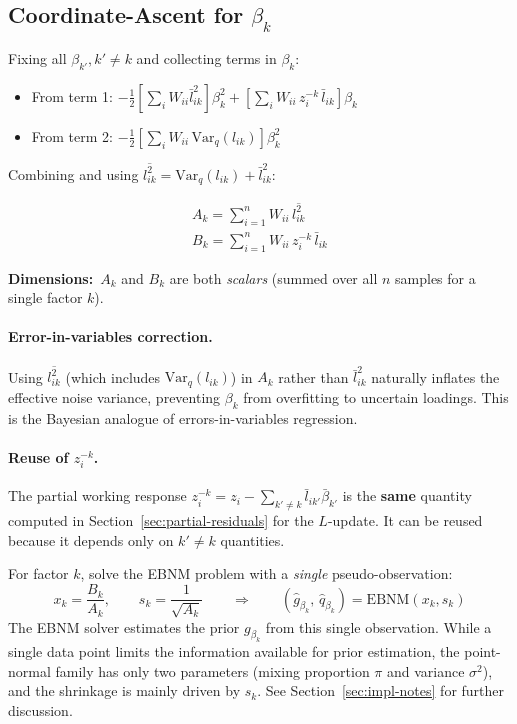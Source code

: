 \documentclass[11pt]{article}
\newcommand{\lbar}[2]{\bar{l}_{#1#2}}
\newcommand{\betabar}[1]{\bar{\beta}_{#1}}
\newcommand{\lsec}[2]{\overline{l^2_{#1#2}}}
\begin{document}
\subsection{Coordinate-Ascent for $\beta_k$}

Fixing all $\beta_{k'}, k'\neq k$ and collecting terms in $\beta_k$:

\begin{itemize}[noitemsep]
\item From term 1: $-\frac{1}{2}[\sum_i W_{ii}\lbar{i}{k}^2]\beta_k^2
      + [\sum_i W_{ii}\,z^{-k}_i\,\lbar{i}{k}]\beta_k$
\item From term 2: $-\frac{1}{2}[\sum_i W_{ii}\,\mathrm{Var}_q(l_{ik})]\beta_k^2$
\end{itemize}

Combining and using $\lsec{i}{k} = \mathrm{Var}_q(l_{ik}) + \lbar{i}{k}^2$:

\begin{align}
  \boxed{A_k = \sum_{i=1}^n W_{ii}\,\lsec{i}{k}}
  \label{eq:A-beta} \\[4pt]
  \boxed{B_k = \sum_{i=1}^n W_{ii}\,z^{-k}_i\,\lbar{i}{k}}
  \label{eq:B-beta}
\end{align}

\textbf{Dimensions:}\ $A_k$ and $B_k$ are both \emph{scalars} (summed
over all $n$ samples for a single factor $k$).

\paragraph{Error-in-variables correction.}
Using $\lsec{i}{k}$ (which includes $\mathrm{Var}_q(l_{ik})$) in $A_k$
rather than $\lbar{i}{k}^2$ naturally inflates the effective noise variance,
preventing $\beta_k$ from overfitting to uncertain loadings.  This is the
Bayesian analogue of errors-in-variables regression.

\paragraph{Reuse of $z^{-k}_i$.}
The partial working response $z^{-k}_i = z_i - \sum_{k'\neq k}\lbar{i}{k'}\betabar{k'}$
is the \textbf{same} quantity computed in Section~\ref{sec:partial-residuals}
for the $L$-update.  It can be reused because it depends only on $k'\neq k$
quantities.

\begin{ebnmbox}
For factor $k$, solve the EBNM problem with a \emph{single}
pseudo-observation:
\[
  x_k = \frac{B_k}{A_k}, \qquad s_k = \frac{1}{\sqrt{A_k}}
  \qquad \Longrightarrow \qquad
  (\hat{g}_{\beta_k},\, \hat{q}_{\beta_k}) = \mathrm{EBNM}(x_k, s_k)
\]
The EBNM solver estimates the prior $g_{\beta_k}$ from this single
observation.  While a single data point limits the information available
for prior estimation, the point-normal family has only two parameters
(mixing proportion $\pi$ and variance $\sigma^2$), and the shrinkage
is mainly driven by $s_k$.  See Section~\ref{sec:impl-notes} for further
discussion.
\end{ebnmbox}
\end{document}
